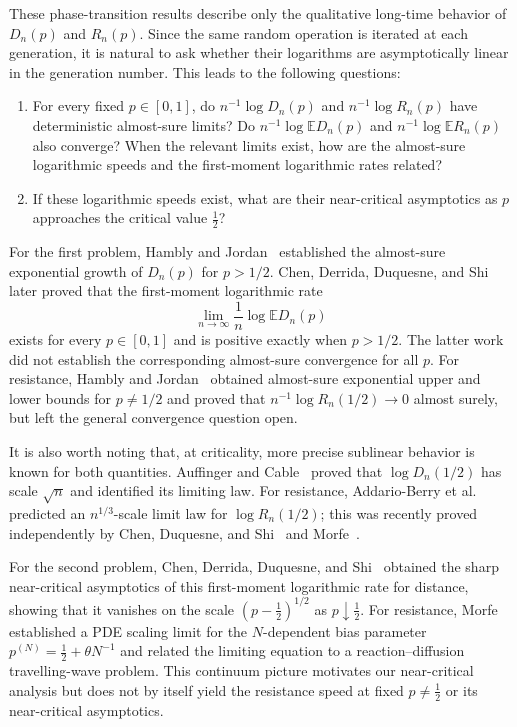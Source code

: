 \documentclass[12pt]{amsart}
\numberwithin{equation}{section}
\theoremstyle{plain}
\theoremstyle{definition}
\newcommand{\E}{\mathbb E}
\begin{document}
These phase-transition results describe only the qualitative long-time
behavior of $D_n(p)$ and $R_n(p)$.  Since the same random operation is
iterated at each generation, it is natural to ask whether their logarithms
are asymptotically linear in the generation number.  This leads to the
following questions:
\begin{enumerate}
\item For every fixed $p\in[0,1]$, do $n^{-1}\log D_n(p)$ and
$n^{-1}\log R_n(p)$ have deterministic almost-sure limits?  Do
$n^{-1}\log\E D_n(p)$ and $n^{-1}\log\E R_n(p)$ also converge?  When the
relevant limits exist, how are the almost-sure logarithmic speeds and the
first-moment logarithmic rates related?
\item If these logarithmic speeds exist, what are their near-critical
asymptotics as $p$ approaches the critical value $\frac12$?
\end{enumerate}

For the first problem, Hambly and Jordan~\cite[Lemma 3.1(a)]{HamblyJordan2004} established
the almost-sure exponential growth of $D_n(p)$ for $p>1/2$.  Chen, Derrida,
Duquesne, and
Shi~\cite[equation~(1.2)]{ChenDerridaDuquesneShi2026} later proved that the
first-moment logarithmic rate
\[
 \lim_{n\to\infty}\frac1n\log\E D_n(p)
\]
exists for every $p\in[0,1]$ and is positive exactly when $p>1/2$.  The latter
work did not establish the corresponding almost-sure convergence for all
$p$.  For resistance, Hambly and Jordan~\cite[Corollaries 2.1 and 2.2]{HamblyJordan2004} obtained almost-sure exponential
upper and lower bounds for $p\ne1/2$ and proved that
$n^{-1}\log R_n(1/2)\to0$ almost surely,
but left the general convergence question open.

It is also worth noting that, at criticality, more precise sublinear behavior
is known for both quantities.  Auffinger and
Cable~\cite[Theorem~1]{AuffingerCable2017} proved that
$\log D_n(1/2)$ has scale $\sqrt n$ and identified its limiting law.  For
resistance, Addario-Berry et al.~\cite{AddarioBerryEtAl2020} predicted an
$n^{1/3}$-scale limit law for $\log R_n(1/2)$; this was recently proved
independently by Chen, Duquesne, and Shi~\cite{ChenDuquesneShi2026} and
Morfe~\cite{Morfe2026}.

For the second problem, Chen, Derrida, Duquesne, and
Shi~\cite[Theorem~1]{ChenDerridaDuquesneShi2026} obtained the sharp
near-critical asymptotics of this first-moment logarithmic rate for distance,
showing that it vanishes on the scale $(p-\frac12)^{1/2}$ as
$p\downarrow\frac12$. For resistance, Morfe~\cite[Theorem~2 and Section~1.5]{Morfe2026} established a PDE scaling limit for the \(N\)-dependent bias parameter \(p^{(N)}=\frac12+\theta N^{-1}\) and related the limiting equation to a reaction--diffusion travelling-wave problem. This continuum picture motivates our near-critical analysis but does not by itself yield the resistance speed at fixed \(p\ne\frac12\) or its near-critical asymptotics.
\end{document}
